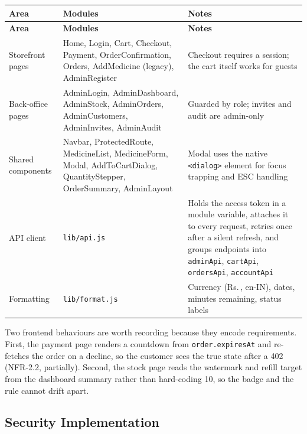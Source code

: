 \documentclass[11pt,a4paper]{article}
\providecommand{\rupee}{Rs.\,}
\begin{document}
{\footnotesize
\begin{longtable}{@{}L{2.80cm}L{7.90cm}L{4.74cm}@{}}
\toprule
\textbf{Area} & \textbf{Modules} & \textbf{Notes}\\
\midrule
\endfirsthead
\toprule
\textbf{Area} & \textbf{Modules} & \textbf{Notes}\\
\midrule
\endhead
\bottomrule
\endlastfoot
Storefront pages & Home, Login, Cart, Checkout, Payment, OrderConfirmation, Orders, AddMedicine (legacy), AdminRegister & Checkout requires a session; the cart itself works for guests\\
Back-office pages & AdminLogin, AdminDashboard, AdminStock, AdminOrders, AdminCustomers, AdminInvites, AdminAudit & Guarded by role; invites and audit are admin-only\\
Shared components & Navbar, ProtectedRoute, MedicineList, MedicineForm, Modal, AddToCartDialog, QuantityStepper, OrderSummary, AdminLayout & Modal uses the native \texttt{<dialog>} element for focus trapping and ESC handling\\
API client & \texttt{lib/api.js} & Holds the access token in a module variable, attaches it to every request, retries once after a silent refresh, and groups endpoints into \texttt{adminApi}, \texttt{cartApi}, \texttt{ordersApi}, \texttt{accountApi}\\
Formatting & \texttt{lib/format.js} & Currency (\rupee, en-IN), dates, minutes remaining, status labels\\
\end{longtable}
}

Two frontend behaviours are worth recording because they encode requirements. First,
the payment page renders a countdown from \texttt{order.expiresAt} and re-fetches the
order on a decline, so the customer sees the true state after a 402 (NFR-2.2,
partially). Second, the stock page reads the watermark and refill target from the
dashboard summary rather than hard-coding 10, so the badge and the rule cannot drift
apart.

\subsection{Security Implementation}
\end{document}
